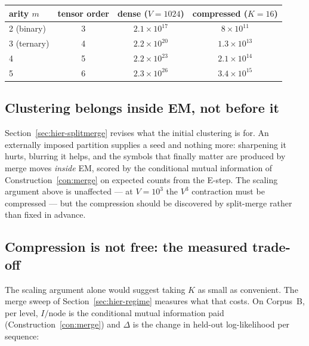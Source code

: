 \begin{center}
\begin{tabular}{lccc}
\toprule
arity $m$ & tensor order & dense ($V=1024$) & compressed ($K=16$) \\
\midrule
2 (binary)  & 3 & $2.1\times10^{17}$ & $8\times10^{11}$ \\
3 (ternary) & 4 & $2.2\times10^{20}$ & $1.3\times10^{13}$ \\
4           & 5 & $2.2\times10^{23}$ & $2.1\times10^{14}$ \\
5           & 6 & $2.3\times10^{26}$ & $3.4\times10^{15}$ \\
\bottomrule
\end{tabular}
\end{center}

\subsection{Clustering belongs inside EM, not before it}

Section~\ref{sec:hier-splitmerge} revises what the initial clustering is for.
An externally imposed partition supplies a seed and nothing more: sharpening it
hurts, blurring it helps, and the symbols that finally matter are produced by
merge moves \emph{inside} EM, scored by the conditional mutual information of
Construction~\ref{con:merge} on expected counts from the E-step. The scaling
argument above is unaffected --- at $V=10^3$ the $V^3$ contraction must be
compressed --- but the compression should be discovered by split-merge rather
than fixed in advance.

\subsection{Compression is not free: the measured trade-off}

The scaling argument alone would suggest taking $K$ as small as convenient.
The merge sweep of Section~\ref{sec:hier-regime} measures what that costs. On
Corpus~B, per level, $I/\text{node}$ is the conditional mutual information paid
(Construction~\ref{con:merge}) and $\Delta$ is the change in held-out
log-likelihood per sequence:

